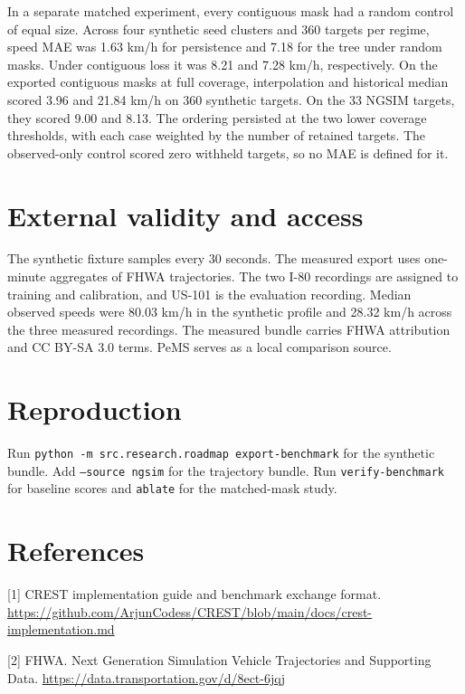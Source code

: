 \documentclass[sigconf,nonacm]{acmart}
\begin{document}
In a separate matched experiment, every contiguous mask had a random control of equal size.
Across four synthetic seed clusters and 360 targets per regime, speed MAE was 1.63 km/h for
persistence and 7.18 for the tree under random masks. Under contiguous loss it was 8.21 and
7.28 km/h, respectively. On the exported contiguous masks at full coverage, interpolation
and historical median scored 3.96 and 21.84 km/h on 360 synthetic targets. On the 33 NGSIM
targets, they scored 9.00 and 8.13. The ordering persisted at the two lower coverage
thresholds, with each case weighted by the number of retained targets. The observed-only
control scored zero withheld targets, so no MAE is defined for it.

\section*{External validity and access}
The synthetic fixture samples every 30 seconds. The measured export uses one-minute aggregates
of FHWA trajectories. The two I-80 recordings are assigned to training and calibration, and
US-101 is the evaluation recording. Median observed speeds were 80.03 km/h in the
synthetic profile and 28.32 km/h across the three measured recordings. The measured bundle
carries FHWA attribution and CC BY-SA 3.0 terms. PeMS serves as a local comparison source.

\section*{Reproduction}
Run \texttt{python -m src.research.roadmap export-benchmark} for the synthetic bundle.
Add \texttt{--source ngsim} for the trajectory bundle. Run \texttt{verify-benchmark} for
baseline scores and \texttt{ablate} for the matched-mask study.

\section*{References}
[1] CREST implementation guide and benchmark exchange format.
\url{https://github.com/ArjunCodess/CREST/blob/main/docs/crest-implementation.md}

[2] FHWA. Next Generation Simulation Vehicle Trajectories and Supporting Data.
\url{https://data.transportation.gov/d/8ect-6jqj}
\end{document}
